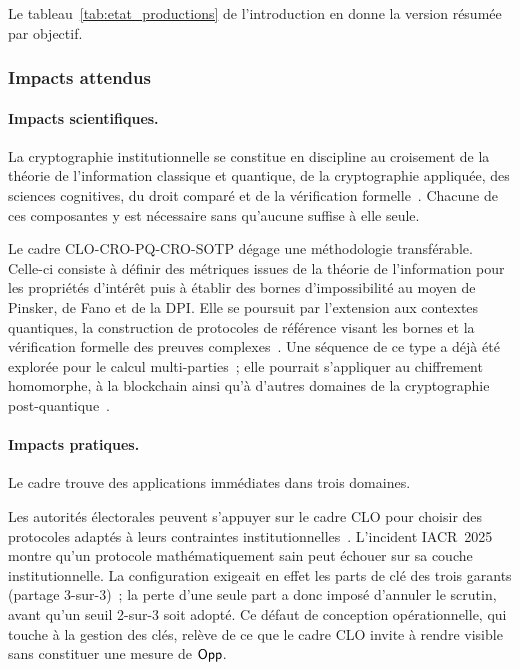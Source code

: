 \begin{sloppypar}
Le tableau~\ref{tab:etat_productions} de l'introduction en donne la version r\'esum\'ee par objectif.

\subsubsection{Impacts attendus}
\label{subsubsec:impacts_attendus}

\paragraph{Impacts scientifiques.}
\label{par:impact_scientifique}

La cryptographie institutionnelle se constitue en discipline
au croisement de la th\'eorie de l'information classique et
quantique, de la cryptographie appliqu\'ee, des sciences cognitives,
du droit compar\'e et de la v\'erification formelle~\cite{Shannon48,NielsenChuang2010,Simon82,Goldreich01,moura2015lean}. Chacune de ces composantes y est
n\'ecessaire sans qu'aucune suffise \`a elle seule.

Le cadre CLO-CRO-PQ-CRO-SOTP d\'egage une m\'ethodologie transf\'erable.
Celle-ci consiste \`a d\'efinir des m\'etriques issues de la th\'eorie de l'information pour les propri\'et\'es
d'int\'er\^et puis \`a \'etablir des bornes d'impossibilit\'e au moyen de Pinsker, de Fano et de la DPI.
Elle se poursuit par l'extension aux contextes quantiques, la construction de protocoles de r\'ef\'erence
visant les bornes et la v\'erification formelle des preuves complexes~\cite{Yao82,GMW87,Asharov12,Gentry09}. Une s\'equence de ce type
a d\'ej\`a \'et\'e explor\'ee pour le calcul multi-parties~; elle pourrait s'appliquer
au chiffrement homomorphe, \`a la blockchain ainsi qu'\`a d'autres domaines de
la cryptographie post-quantique~\cite{BrakerskiVaikuntanathan11,Nakamoto08,Zohar15}.

\paragraph{Impacts pratiques.}
\label{par:impact_pratique}

Le cadre trouve des applications imm\'ediates dans trois domaines.

Les autorit\'es \'electorales peuvent s'appuyer sur le cadre CLO pour choisir
des protocoles adapt\'es \`a leurs contraintes institutionnelles~\cite{Adida08,Lindeman12,Benaloh94}. L'incident
IACR~2025~\cite{IACR2025incident} montre qu'un protocole math\'ematiquement
sain peut \'echouer sur sa couche institutionnelle. La configuration
exigeait en effet les parts de cl\'e des trois garants (partage 3-sur-3)~; la perte
d'une seule part a donc impos\'e d'annuler le scrutin, avant qu'un seuil
2-sur-3 soit adopt\'e. Ce d\'efaut de conception op\'erationnelle, qui touche \`a la gestion des
cl\'es, rel\`eve de ce que le cadre CLO invite \`a rendre visible sans constituer une mesure de $\mathsf{Opp}$.


\end{sloppypar}

